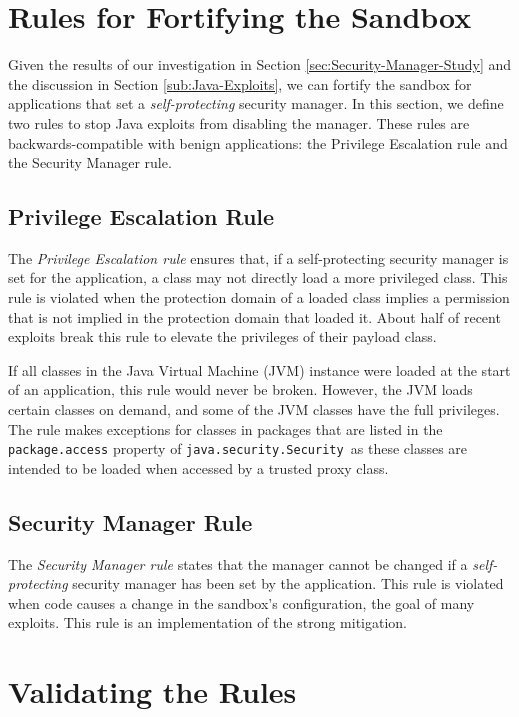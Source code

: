 \documentclass{sig-alternate}
\begin{document}
\section{Rules for Fortifying the Sandbox}\label{sec:Rules-for-Fortifying}

Given the results of our investigation in Section \ref{sec:Security-Manager-Study}
and the discussion in Section \ref{sub:Java-Exploits}, we can fortify
the sandbox for applications that set a\emph{ self-protecting} security
manager. In this section, we define two rules to stop Java exploits
from disabling the manager. These rules are backwards-compatible with
benign applications: the Privilege Escalation rule and the Security
Manager rule. 


\subsection{Privilege Escalation Rule}

The \textit{Privilege Escalation rule} ensures that, if a self-protecting
security manager is set for the application, a class may not directly
load a more privileged class. This rule is violated when the protection
domain of a loaded class implies a permission that is not implied
in the protection domain that loaded it. About half of recent exploits
break this rule to elevate the privileges of their payload class.

If all classes in the Java Virtual Machine (JVM) instance were loaded
at the start of an application, this rule would never be broken. However,
the JVM loads certain classes on demand, and some of the JVM classes
have the full privileges. The rule makes exceptions for classes in
packages that are listed in the \texttt{package.access} property of
\texttt{java.security.Security }as these classes are intended to be
loaded when accessed by a trusted proxy class. 


\subsection{Security Manager Rule}

The \textit{Security Manager rule} states that the manager cannot
be changed if a \emph{self-protecting} security manager has been set
by the application. This rule is violated when code causes a change
in the sandbox's configuration, the goal of many exploits. This rule
is an implementation of the strong mitigation.

\section{Validating the Rules}\label{sec:Mitigations}
\end{document}
